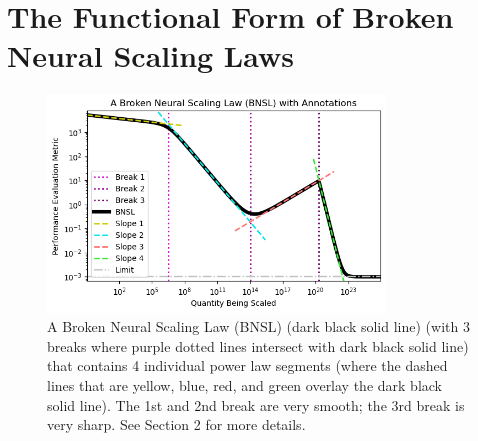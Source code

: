 \documentclass{article} %
\begin{document}
%
\vspace{-2.6mm}
\section{The Functional Form of Broken Neural Scaling Laws }
\label{section:bnsl}
\vspace{-4.4mm}

\begin{figure}[h]%
    \centering


\hspace*{-.04cm}\includegraphics[width=0.80\textwidth]{figures/figure_1/figure_1__wide.png}
\vspace{-4.1mm}

    \caption{A Broken Neural Scaling Law (BNSL) (dark black solid line) (with 3 breaks where purple dotted lines intersect with dark black solid line) that contains 4 individual power law segments (where the dashed lines that are yellow, blue, red, and green overlay the dark black solid line). The 1st and 2nd break are very smooth; the 3rd break is very sharp. See Section 2 for more details.}
    \label{fig:figure_1}
\end{figure}

\end{document}
